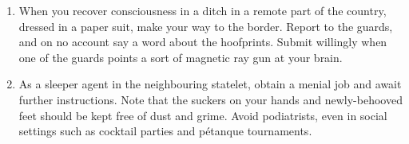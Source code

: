 \begin{enumerate}[i]
\item When you recover consciousness in a ditch in a remote part of the country, dressed in a paper suit, make your way to the border. Report to the guards, and on no account say a word about the hoofprints. Submit willingly when one of the guards points a sort of magnetic ray gun at your brain.

\item As a sleeper agent in the neighbouring statelet, obtain a menial job and await further instructions. Note that the suckers on your hands and newly-behooved feet should be kept free of dust and grime. Avoid podiatrists, even in social settings such as cocktail parties and p\'{e}tanque tournaments.
\end{enumerate}